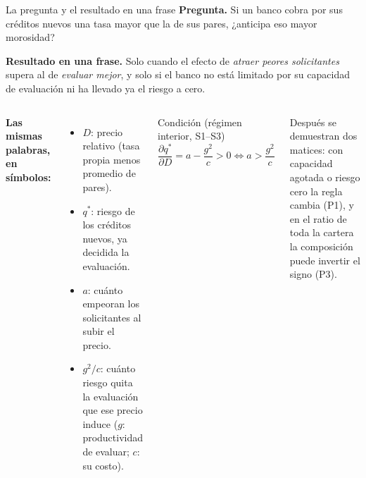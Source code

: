 \documentclass[aspectratio=169,10pt,t]{beamer}
\newcommand{\qs}{q^{*}}
\begin{document}
\begin{frame}{La pregunta y el resultado en una frase}
\vspace{1mm}
\textbf{Pregunta.} Si un banco cobra por sus créditos nuevos una tasa mayor que la de
sus pares, ¿anticipa eso mayor morosidad?
\begin{keybox}
\textbf{Resultado en una frase.} Solo cuando el efecto de \emph{atraer peores
solicitantes} supera al de \emph{evaluar mejor}, y solo si el banco no está limitado
por su capacidad de evaluación ni ha llevado ya el riesgo a cero.
\end{keybox}
\begin{columns}[T,onlytextwidth]
\small\textbf{Las mismas palabras, en símbolos:}
\begin{itemize}\setlength{\itemsep}{.4mm}
\item $D$: precio relativo (tasa propia menos promedio de pares).
\item $\qs$: riesgo de los créditos nuevos, ya decidida la evaluación.
\item $a$: cuánto empeoran los solicitantes al subir el precio.
\item $g^{2}/c$: cuánto riesgo quita la evaluación que ese precio induce ($g$:
productividad de evaluar; $c$: su costo).
\end{itemize}
\begin{propbox}{Condición (régimen interior, S1--S3)}
\[
\frac{\partial \qs}{\partial D}=a-\frac{g^{2}}{c}>0\iff a>\frac{g^{2}}{c}
\]
\end{propbox}
{\footnotesize Después se demuestran dos matices: con capacidad agotada o riesgo cero
la regla cambia (P1), y en el ratio de toda la cartera la composición puede invertir
el signo (P3).\par}
\end{columns}
\end{frame}
\end{document}
